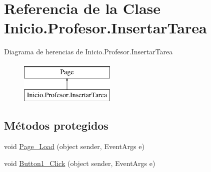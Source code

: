 \hypertarget{classInicio_1_1Profesor_1_1InsertarTarea}{}\section{Referencia de la Clase Inicio.\+Profesor.\+Insertar\+Tarea}
\label{classInicio_1_1Profesor_1_1InsertarTarea}
Diagrama de herencias de Inicio.\+Profesor.\+Insertar\+Tarea\begin{figure}[H]
\begin{center}
\leavevmode
\includegraphics[height=2.000000cm]{classInicio_1_1Profesor_1_1InsertarTarea}
\end{center}
\end{figure}
\subsection*{Métodos protegidos}
\begin{DoxyCompactItemize}
\item 
void \mbox{\hyperlink{classInicio_1_1Profesor_1_1InsertarTarea_a5f359452bc899f09d58aff0f147ced0e}{Page\+\_\+\+Load}} (object sender, Event\+Args e)
\item 
void \mbox{\hyperlink{classInicio_1_1Profesor_1_1InsertarTarea_a1eea942857a082136fc980b5540c0edc}{Button1\+\_\+\+Click}} (object sender, Event\+Args e)
\end{DoxyCompactItemize}
